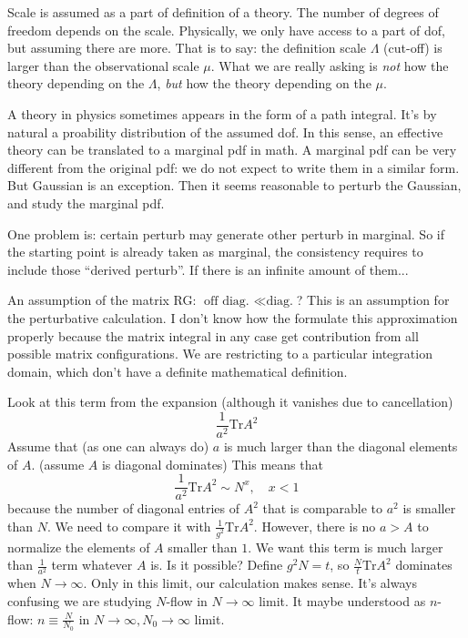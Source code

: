 Scale is assumed as a part of definition of a theory.
The number of degrees of freedom depends on the scale.
Physically, we only have access to a part of dof,
but assuming there are more.
That is to say: the definition scale $\Lambda$ (cut-off)
is larger than the observational scale $\mu$.
What we are really asking is \emph{not} how the theory depending
on the $\Lambda$,
\emph{but} how the theory depending on the $\mu$.

A theory in physics sometimes appears in the form of a path integral.
It's by natural a proability distribution of the assumed dof.
In this sense, an effective theory can be translated to a marginal pdf in math.
A marginal pdf can be very different from the original pdf:
we do not expect to write them in a similar form.
But Gaussian is an exception.
Then it seems reasonable to perturb the Gaussian,
and study the marginal pdf.

One problem is: certain perturb may generate other perturb in marginal.
So if the starting point is already taken as marginal,
the consistency requires to include those ``derived perturb''.
If there is an infinite amount of them...

\begin{problem}
	An assumption of the matrix RG: $\text{off diag. } \ll \text{diag.}$?
	This is an assumption for the perturbative calculation.
	I don't know how the formulate this approximation properly
	because the matrix integral in any case get contribution from
	all possible matrix configurations.
	We are restricting to a particular integration domain,
	which don't have a definite mathematical definition.
\end{problem}

\begin{problem}
	Look at this term from the expansion (although it vanishes due to cancellation)
	\[
	\frac{1}{a^2}\mathrm{Tr}A^2
	\] 
Assume that (as one can always do) $a$ is much larger than the diagonal elements of $A$.
(assume $A$ is diagonal dominates)
This means that
\[
	\frac{1}{a^2} \mathrm{Tr} A^2 \sim N^x,\quad x<1
\] 
because the number of diagonal entries of $A^2$ that is comparable to $a^2$ is smaller than $N$.
We need to compare it with $\frac{1}{g^2}\mathrm{Tr}A^2$.
However, there is no $a>A$ to normalize the elements of $A$ smaller than $1$.
We want this term is much larger than $\frac{1}{a^2}$ term whatever $A$ is.
Is it possible? Define $g^2 N = t$, so $\frac{N}{t}\mathrm{Tr}A^2$ dominates when $N\to\infty$.
Only in this limit, our calculation makes sense.
It's always confusing we are studying $N$-flow in $N\to\infty$ limit.
It maybe understood as $n$-flow: $n\equiv \frac{N}{N_0}$ in $N\to\infty,N_0\to\infty$ limit.
\end{problem}
